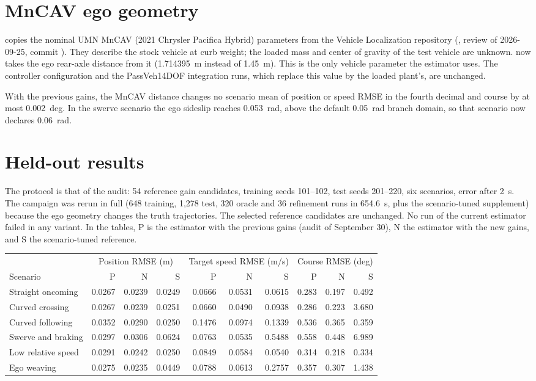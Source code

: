 \documentclass[11pt]{article}
\begin{document}
\section{MnCAV ego geometry}
 copies the nominal UMN MnCAV (2021 Chrysler
Pacifica Hybrid) parameters from the Vehicle Localization repository
(, review of 2026-09-25, commit
). They describe the stock
vehicle at curb weight; the loaded mass and center of gravity of the test
vehicle are unknown.  now takes the ego
rear-axle distance from it (1.714395~m instead of 1.45~m). This is the only
vehicle parameter the estimator uses. The controller configuration and the
PassVeh14DOF integration runs, which replace this value by the loaded plant's,
are unchanged.

With the previous gains, the MnCAV distance changes no scenario mean of
position or speed RMSE in the fourth decimal and course by at most
0.002~deg. In the swerve scenario the ego sideslip reaches 0.053~rad, above
the default 0.05~rad branch domain, so that scenario now declares 0.06~rad.

\section{Held-out results}
The protocol is that of the audit: 54 reference gain candidates, training
seeds 101--102, test seeds 201--220, six scenarios, error after 2~s. The
campaign was rerun in full (648 training, 1,278 test, 320 oracle and 36
refinement runs in 654.6~s, plus the scenario-tuned supplement) because the
ego geometry changes the truth trajectories. The selected reference
candidates are unchanged. No run of the current estimator failed in any
variant. In the tables, P is the estimator with the previous gains (audit of
September 30), N the estimator with the new gains, and S the scenario-tuned
reference.

\begin{center}\small
\begin{tabular}{@{}lrrrrrrrrr@{}}
\toprule
&\multicolumn{3}{c}{Position RMSE (m)}&\multicolumn{3}{c}{Target speed RMSE (m/s)}&\multicolumn{3}{c}{Course RMSE (deg)}\\
Scenario&P&N&S&P&N&S&P&N&S\\
\midrule
Straight oncoming&0.0267&0.0239&0.0249&0.0666&0.0531&0.0615&0.283&0.197&0.492\\
Curved crossing&0.0267&0.0239&0.0251&0.0660&0.0490&0.0938&0.286&0.223&3.680\\
Curved following&0.0352&0.0290&0.0250&0.1476&0.0974&0.1339&0.536&0.365&0.359\\
Swerve and braking&0.0297&0.0306&0.0624&0.0763&0.0535&0.5488&0.558&0.448&6.989\\
Low relative speed&0.0291&0.0242&0.0250&0.0849&0.0584&0.0540&0.314&0.218&0.334\\
Ego weaving&0.0275&0.0235&0.0449&0.0788&0.0613&0.2757&0.357&0.307&1.438\\
\bottomrule
\end{tabular}\end{center}
\end{document}
